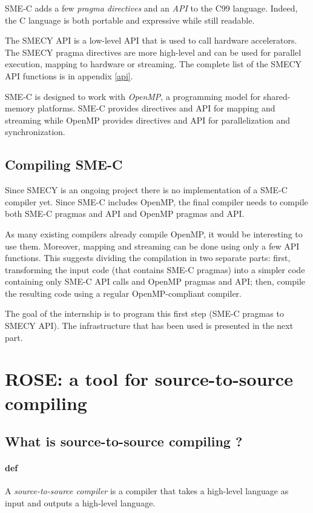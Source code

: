 \documentclass [A4]{article}
\begin{document}
	SME-C adds a few \emph{pragma directives} and an \emph{API} to the C99 language. Indeed, the C language is both portable and expressive while still readable.
	
	The SMECY API is a low-level API that is used to call hardware accelerators. The SMECY pragma directives are more high-level and can be used for parallel execution, mapping to hardware or streaming. The complete list of the SMECY API functions is in appendix \ref{api}.
	
	SME-C is designed to work with \emph{OpenMP}, a programming model for shared-memory platforms. SME-C provides directives and API for mapping and streaming while OpenMP provides directives and API for parallelization and synchronization.
	
	\subsection{Compiling SME-C}
	Since SMECY is an ongoing project there is no implementation of a SME-C compiler yet. Since SME-C includes OpenMP, the final compiler needs to compile both SME-C pragmas and API and OpenMP pragmas and API.
	
	As many existing compilers already compile OpenMP, it would be interesting to use them. Moreover, mapping and streaming can be done using only a few API functions. This suggests dividing the compilation in two separate parts: first, transforming the input code (that contains SME-C pragmas) into a simpler code containing only SME-C API calls and OpenMP pragmas and API; then, compile the resulting code using a regular OpenMP-compliant compiler.

	The goal of the internship is to program this first step (SME-C pragmas to SMECY API). The infrastructure that has been used is presented in the next part.

\section{ROSE: a tool for source-to-source compiling}
	\subsection{What is source-to-source compiling ?}
	\paragraph{def}A \emph{source-to-source compiler} is a compiler that takes a high-level language as input and outputs a high-level language.
	
\end{document}

